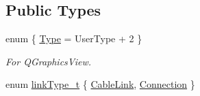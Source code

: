 \subsection*{Public Types}
\begin{DoxyCompactItemize}
\item 
enum \{ \hyperlink{classmdt_cl_path_graphics_link_a5813cf269d04fc1ff16163504f2f4149aa723cdfcf53fb7f9035577f8b91e6651}{Type} = User\-Type + 2
 \}
\begin{DoxyCompactList}\small\item\em For Q\-Graphics\-View. \end{DoxyCompactList}\item 
enum \hyperlink{classmdt_cl_path_graphics_link_a6ac32ab30f4b6193fcd0cd4d3d51ea2d}{link\-Type\-\_\-t} \{ \hyperlink{classmdt_cl_path_graphics_link_a6ac32ab30f4b6193fcd0cd4d3d51ea2da8b0111c49fc77799f8ac81624a5e6c56}{Cable\-Link}, 
\hyperlink{classmdt_cl_path_graphics_link_a6ac32ab30f4b6193fcd0cd4d3d51ea2da8da60a183772ac364b8e845e0f22430d}{Connection}
 \}
\end{DoxyCompactItemize}

